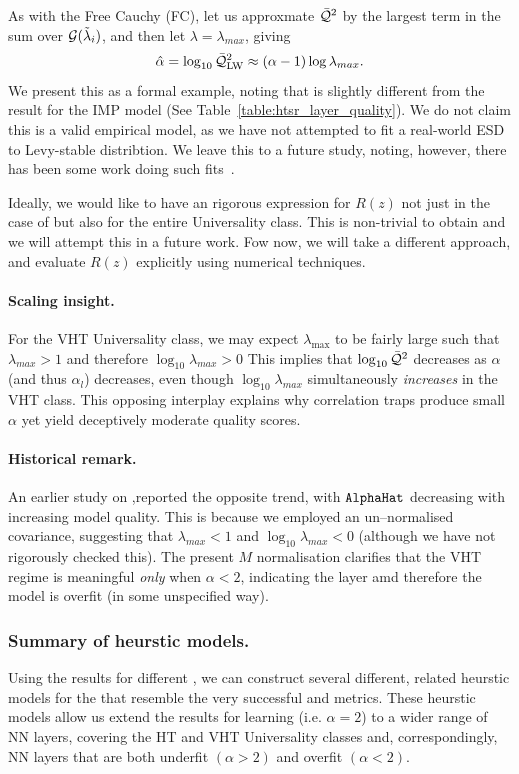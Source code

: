 As with the Free Cauchy (FC), let us approxmate $\bar{\mathcal{Q}}^{2}$ by the largest term in the sum over $\mathcal{G}(\tilde{\lambda}_{i})$, and then let $\lambda=\lambda_{max}$, giving
\begin{equation} 
\label{eqn:LW_model_4} 
\hat\alpha = \log_{10} \bar{\mathcal{Q}}^{2}_{\mathrm{LW}} \approx (\alpha-1)\log\lambda_{max}   .
\end{equation}
We present this as a formal example, noting that is slightly different from the result for the IMP model
(See Table~\ref{table:htsr_layer_quality}). 
We do not claim this is a valid empirical model, as we have not attempted to fit a real-world ESD to Levy-stable distribtion.  
We leave this to a future study, noting, however, there has been some work doing such fits~\cite{li2024exploring}.

Ideally, we would like to have an rigorous expression for $R(z)$ not just
in the case of \IdealLearning but also for the entire \FatTailed Universality class.
This is non-trivial to obtain and we will attempt this in a future work.
Fow now, we will take a different approach, and evaluate $R(z)$ explicitly using numerical techniques.

\paragraph{Scaling insight.}
For the VHT Universality class, we may expect $\lambda_{\max}$ to be fairly large such that
$\lambda_{max}>1$ and therefore $\log_{10}\lambda_{max}>0$
This implies that  $\log_{10}\bar{\mathcal{Q}}^{2}$ decreases  as $\alpha$ (and thus $\alpha_l$) decreases, even though
$\log_{10}\lambda_{max}$ simultaneously \emph{increases} in the VHT class.
This opposing interplay explains why correlation traps produce small $\alpha$ yet yield deceptively moderate quality scores.

\paragraph{Historical remark.}
An earlier study on \ALPHAHAT,reported the opposite trend, with $\texttt{AlphaHat}$ decreasing with increasing model quality.
This is because we employed an un–normalised covariance, suggesting that $\lambda_{max}<1$ and $\log_{10}\lambda_{max}<0$
(although we have not rigorously checked this).
The present $M$ normalisation clarifies that the VHT regime is meaningful \emph{only} when $\alpha<2$,
indicating the layer amd therefore the model is overfit (in some unspecified way).


\subsubsection{Summary of heurstic models.}
Using the results for different \RTransforms, we can construct several different, related heurstic models for the \LayerQuality
that resemble the very successful \WW \HTSR \ALPHA and \ALPHAHAT metrics.  These heurstic models allow us extend
the \SETOL results for \Ideal learning (i.e. $\alpha=2$) to a wider range of NN layers, covering the \HTSR
HT and VHT Universality classes and, correspondingly, NN layers that are both underfit $(\alpha>2)$
and overfit $(\alpha<2)$.

